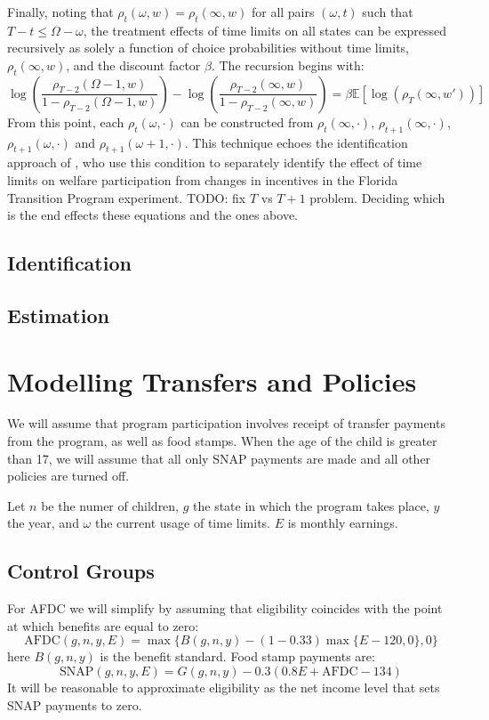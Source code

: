 \documentclass[12pt]{article}
\newcommand\EE{\mathbb{E}}
\numberwithin{equation}{section}
\numberwithin{figure}{section}
\numberwithin{table}{section}
\begin{document}
Finally, noting that $\rho_t(\omega,w) = \rho_t(\infty,w)$ for all pairs $(\omega,t)$ such that $T-t\leq\Omega-\omega$, the treatment effects of time limits on all states can be expressed recursively as solely a function of choice probabilities without time limits, $\rho_t(\infty,w)$, and the discount factor $\beta$. The recursion begins with:
\[
\log\left(\frac{\rho_{T-2}(\Omega-1,w)}{1-\rho_{T-2}(\Omega-1,w)}\right)-\log\left(\frac{\rho_{T-2}(\infty,w)}{1-\rho_{T-2}(\infty,w)}\right) = \beta\EE[\log(\rho_{T}(\infty,w'))]
\]
From this point, each $\rho_{t}(\omega,\cdot)$ can be constructed from $\rho_{t}(\infty,\cdot)$, $\rho_{t+1}(\infty,\cdot)$, $\rho_{t+1}(\omega,\cdot)$ and $\rho_{t+1}(\omega+1,\cdot)$.
This technique echoes the identification approach of \cite{GroggerMichal2003}, who use this condition to separately identify the effect of time limits on welfare participation from changes in incentives in the Florida Transition Program experiment.
{\color{red} TODO: fix $T$ vs $T+1$ problem. Deciding which is the end effects these equations and the ones above. }


\subsection{Identification}

\subsection{Estimation}

\section{Modelling Transfers and Policies}
We will assume that program participation involves receipt of transfer payments from the program, as well as food stamps. When the age of the child is greater than 17, we will assume that all only SNAP payments are made and all other policies are turned off.

Let $n$ be the numer of children, $g$ the state in which the program takes place, $y$ the year, and $\omega$ the current usage of time limits. $E$ is monthly earnings.

\subsection{Control Groups}
For AFDC we will simplify by assuming that eligibility coincides with the point at which benefits are equal to zero:
\[\text{AFDC}(g,n,y,E) = \max\{B(g,n,y) - (1-0.33)\max\{E - 120,0\},0\} \]
here $B(g,n,y)$ is the benefit standard.
Food stamp payments are:
\[\text{SNAP}(g,n,y,E) = G(g,n,y) - 0.3(0.8E + \text{AFDC} - 134)\]
It will be reasonable to approximate eligibility as the net income level that sets SNAP payments to zero.
\end{document}
